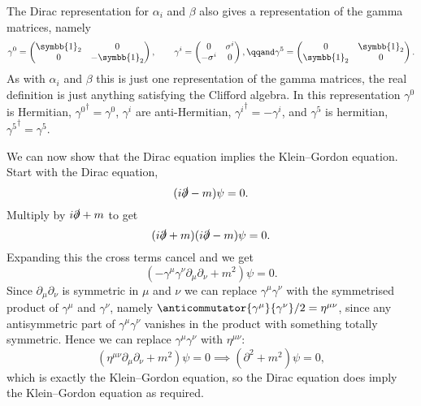 \documentclass[fleqn]{NotesClass}
\newcommand{\dalembertian}{\partial^2}
\newcommand{\hermit}{{\dagger}}
\newcommand{\ident}{\symbb{1}}
\begin{document}
    The Dirac representation for \(\alpha_i\) and \(\beta\) also gives a representation of the gamma matrices, namely
    \begin{equation}
        \gamma^0 = 
        \begin{pmatrix}
            \ident_2 & 0\\
            0 & -\ident_2
        \end{pmatrix}
        , \qquad \gamma^i = 
        \begin{pmatrix}
            0 & \sigma^i\\
            -\sigma^i & 0
        \end{pmatrix}
        , \qqand \gamma^5 = 
        \begin{pmatrix}
            0 & \ident_2\\
            \ident_2 & 0
        \end{pmatrix}
        .
    \end{equation}
    As with \(\alpha_i\) and \(\beta\) this is just one representation of the gamma matrices, the real definition is just anything satisfying the Clifford algebra.
    In this representation \(\gamma^0\) is Hermitian, \({\gamma^0}^\hermit = \gamma^0\), \(\gamma^i\) are anti-Hermitian, \({\gamma^i}^\hermit = -\gamma^i\), and \(\gamma^5\) is hermitian, \({\gamma^5}^\hermit = \gamma^5\).
    
    We can now show that the Dirac equation implies the Klein--Gordon equation.
    Start with the Dirac equation,
    \begin{equation}
        (i\slashed{\partial} - m)\psi = 0.
    \end{equation}
    Multiply by \(i\slashed{\partial} + m\) to get
    \begin{equation}
        (i\slashed{\partial} + m)(i\slashed{\partial} - m)\psi = 0.
    \end{equation}
    Expanding this the cross terms cancel and we get
    \begin{equation}
        (-\gamma^\mu \gamma^\nu \partial_\mu \partial_\nu + m^2)\psi = 0.
    \end{equation}
    Since \(\partial_\mu\partial_\nu\) is symmetric in \(\mu\) and \(\nu\) we can replace \(\gamma^\mu\gamma^\nu\) with the symmetrised product of \(\gamma^\mu\) and \(\gamma^\nu\), namely \(\anticommutator{\gamma^\mu}{\gamma^\nu}/2 = \eta^{\mu\nu}\), since any antisymmetric part of \(\gamma^\mu\gamma^\nu\) vanishes in the product with something totally symmetric.
    Hence we can replace \(\gamma^\mu\gamma^\nu\) with \(\eta^{\mu\nu}\):
    \begin{equation}
        (\eta^{\mu\nu}\partial_\mu\partial_\nu + m^2)\psi = 0 \implies (\dalembertian + m^2) \psi = 0,
    \end{equation}
    which is exactly the Klein--Gordon equation, so the Dirac equation does imply the Klein--Gordon equation as required.
    
\end{document}
